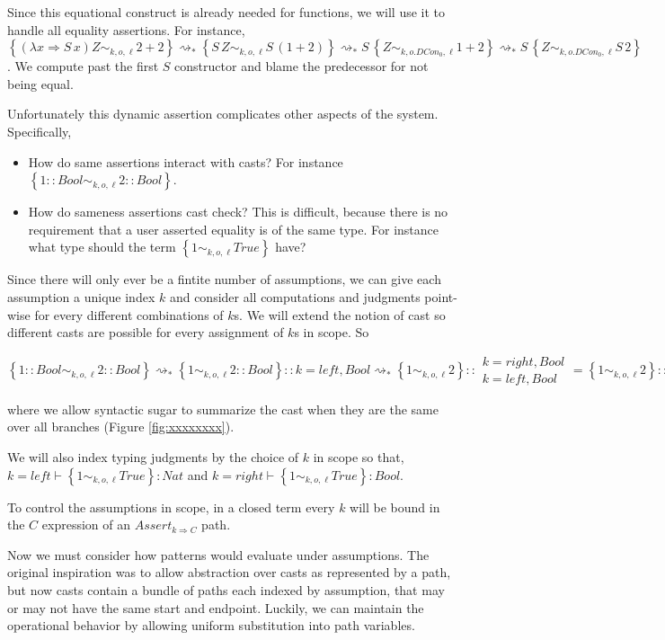 Since this equational construct is already needed for functions, we
will use it to handle all equality assertions. For instance, $\left\{ \left(\lambda x\Rightarrow S\,x\right)Z\sim_{k,o,\ell}2+2\right\} \rightsquigarrow_{*}\left\{ S\,Z\sim_{k,o,\ell}S\,\left(1+2\right)\right\} \rightsquigarrow_{*}S\,\left\{ Z\sim_{k,o.DCon_{0},\ell}1+2\right\} \rightsquigarrow_{*}S\,\left\{ Z\sim_{k,o.DCon_{0},\ell}S\,2\right\} $.
We compute past the first $S$ constructor and blame the predecessor
for not being equal.

Unfortunately this dynamic assertion complicates other aspects of
the system. Specifically, 
\begin{itemize}
\item How do same assertions interact with casts? For instance $\left\{ 1::Bool\sim_{k,o,\ell}2::Bool\right\} $. 
\item How do sameness assertions cast check? This is difficult, because
there is no requirement that a user asserted equality is of the same
type. For instance what type should the term $\left\{ 1\sim_{k,o,\ell}True\right\} $
have?
\end{itemize}
Since there will only ever be a fintite number of assumptions, we
can give each assumption a unique index $k$ and consider all computations
and judgments point-wise for every different combinations of $k$s.
We will extend the notion of cast so different casts are possible
for every assignment of $k$s in scope. So 

$\left\{ 1::Bool\sim_{k,o,\ell}2::Bool\right\} \rightsquigarrow_{*}\left\{ 1\sim_{k,o,\ell}2::Bool\right\} ::k=left,Bool\rightsquigarrow_{*}\left\{ 1\sim_{k,o,\ell}2\right\} ::\begin{array}{c}
k=right,Bool\\
k=left,Bool
\end{array}=\left\{ 1\sim_{k,o,\ell}2\right\} ::Bool$ 

where we allow syntactic sugar to summarize the cast when they are
the same over all branches (Figure \ref{fig:xxxxxxxx}).

We will also index typing judgments by the choice of $k$ in scope
so that, $k=left\vdash\left\{ 1\sim_{k,o,\ell}True\right\} :Nat$
and $k=right\vdash\left\{ 1\sim_{k,o,\ell}True\right\} :Bool$.

To control the assumptions in scope, in a closed term every $k$ will
be bound in the $C$ expression of an $Assert_{k\Rightarrow C}$ path.

Now we must consider how patterns would evaluate under assumptions.
The original inspiration was to allow abstraction over casts as represented
by a path, but now casts contain a bundle of paths each indexed by
assumption, that may or may not have the same start and endpoint.
Luckily, we can maintain the operational behavior by allowing uniform
substitution into path variables.

